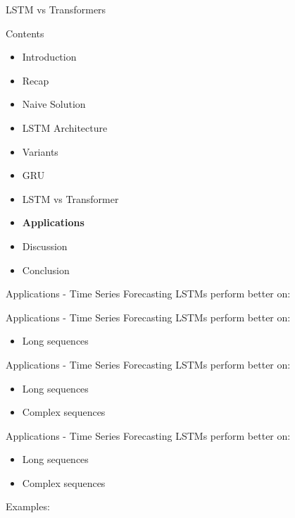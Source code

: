 \documentclass[10pt, aspectratio=169]{beamer}
\begin{document}
\begin{frame}[t]{LSTM vs Transformers}
    
\end{frame}

\begin{frame}[t]{Contents}
\begin{itemize}
    \item Introduction
    \item Recap
    \item Naive Solution
    \item LSTM Architecture
    \item Variants
    \item GRU
    \item LSTM vs Transformer
    \item \textbf{Applications}
    \item Discussion
    \item Conclusion
\end{itemize}
\end{frame}
\begin{frame}[t]{Applications - Time Series Forecasting}
LSTMs perform better on:
\end{frame}

\begin{frame}[t]{Applications - Time Series Forecasting}
LSTMs perform better on:
\begin{itemize}
    \item Long sequences
\end{itemize}
\end{frame}

\begin{frame}[t]{Applications - Time Series Forecasting}
LSTMs perform better on:
\begin{itemize}
    \item Long sequences
    \item Complex sequences
\end{itemize}
\end{frame}

\begin{frame}[t]{Applications - Time Series Forecasting}
LSTMs perform better on:
\begin{itemize}
    \item Long sequences
    \item Complex sequences
\end{itemize}
Examples:
\end{frame}
\end{document}
